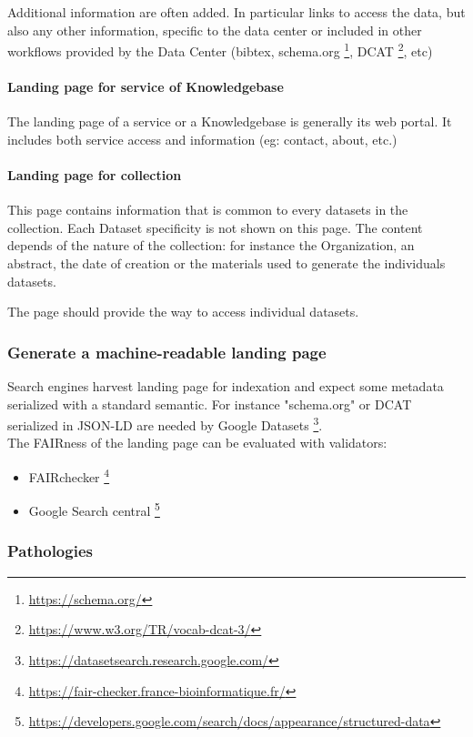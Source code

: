 \documentclass[11pt,a4paper]{ivoa}
\begin{document}
Additional information are often added. In particular links to access the data, but also any other information, specific to the data center or included in other workflows provided by the Data Center (bibtex, schema.org \footnote{\url{https://schema.org/}}, DCAT \footnote{\url{https://www.w3.org/TR/vocab-dcat-3/}}, etc)


\paragraph{Landing page for service of Knowledgebase}
The landing page of a service or a Knowledgebase is generally its web portal. It includes both service access and information (eg: contact, about, etc.)

\paragraph{Landing page for collection}
This page contains information that is common to every datasets in the collection. Each Dataset specificity is not shown on this page. The content depends of the nature of the collection: for instance the Organization, an abstract, the date of creation or the materials used to generate the individuals datasets.

The page should provide the way to access individual datasets.

\subsubsection{Generate a machine-readable landing page}
Search engines harvest landing page for indexation and expect some metadata serialized with a standard semantic. For instance "schema.org" or DCAT serialized in JSON-LD are needed by Google Datasets \footnote{\url{https://datasetsearch.research.google.com/}}.\\


The FAIRness of the landing page can be evaluated with validators:
\begin{itemize}
    \item FAIRchecker \footnote{\url{https://fair-checker.france-bioinformatique.fr/}}
    \item Google Search central \footnote{\url{https://developers.google.com/search/docs/appearance/structured-data}}
\end{itemize}


\subsubsection{Pathologies}
\end{document}
